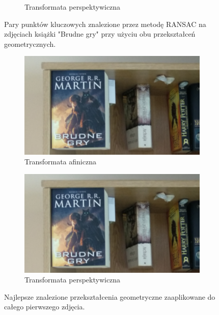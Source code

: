 \documentclass{article}
\begin{document}
\begin{figure}[H]
\begin{subfigure}[b]{0.4\linewidth}
			\caption{Transformata perspektywiczna}
		\end{subfigure}
		\caption{Pary punktów kluczowych znalezione przez metodę RANSAC na zdjęciach książki "Brudne gry" przy użyciu obu przekształceń geometrycznych.}
		\label{fig:transforms11}
	\end{figure}
	\begin{figure}[H]
		\centering
		\begin{subfigure}[b]{0.4\linewidth}
			\includegraphics[width=\linewidth]{a1-trans.png}
			\caption{Transformata afiniczna}
		\end{subfigure}
		\begin{subfigure}[b]{0.4\linewidth}
			\includegraphics[width=\linewidth]{p1-trans.png}
			\caption{Transformata perspektywiczna}
		\end{subfigure}
		\caption{Najlepsze znalezione przekształcenia geometryczne zaaplikowane do całego pierwszego zdjęcia.}
		\label{fig:transforms12}
	\end{figure}

	
\end{document}
